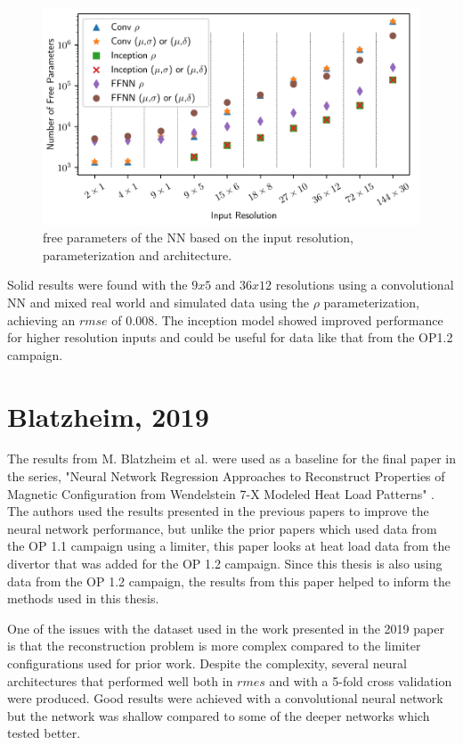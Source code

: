 \begin{figure}[!htb]
	\centering
	\includegraphics[width = \textwidth]{images/daniel-input-parameters.png}
	\caption{free parameters of the NN based on the input resolution, parameterization and architecture.} \label{fig:daniel-input-parameters}
\end{figure}

Solid results were found with the $9x5$ and $36x12$ resolutions using a convolutional NN and mixed real world and simulated data using the $\rho$ parameterization, achieving an $rmse$ of 0.008. The inception model showed improved performance for higher resolution inputs and could be useful for data like that from the OP1.2 campaign.

\section{Blatzheim, 2019}

The results from M. Blatzheim et al. were used as a baseline for the final paper in the series, "Neural Network Regression Approaches to Reconstruct Properties of Magnetic Configuration from Wendelstein 7-X Modeled Heat Load Patterns" \cite{Blatzheim_2019}. The authors used the results presented in the previous papers to improve the neural network performance, but unlike the prior papers which used data from the OP 1.1 campaign using a limiter, this paper looks at heat load data from the divertor that was added for the OP 1.2 campaign. Since this thesis is also using data from the OP 1.2 campaign, the results from this paper helped to inform the methods used in this thesis.

One of the issues with the dataset used in the work presented in the 2019 paper is that the reconstruction problem is more complex compared to the limiter configurations used for prior work. Despite the complexity, several neural architectures that performed well both in $rmes$ and with a 5-fold cross validation were produced. Good results were achieved with a convolutional neural network but the network was shallow compared to some of the deeper networks which tested better.